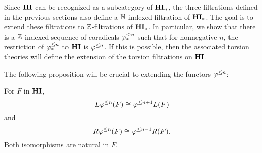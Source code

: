 Since $\mathbf{HI}$ can be recognized as a subcategory of $\mathbf{HI}_*$, the
three filtrations defined in the previous sections also define
a $\mathbb{N}$-indexed filtration of $\mathbf{HI}_*$. The goal is to extend these
filtrations to $\mathbb{Z}$-filtrations of $\mathbf{HI}_*$. In particular, we show
that there is a $\mathbb{Z}$-indexed sequence of coradicals $\varphi^{\leq n}_{*}$
such that for nonnegative $n$, the restriction of $\varphi^{\leq n}_{*}$ to
$\mathbf{HI}$ is $\varphi^{\leq n}$. If this is possible, then the associated
torsion theories will define the extension of the torsion 
filtrations on $\mathbf{HI}$.

The following proposition will be crucial to extending the 
functors $\varphi^{\leq n}$:

\begin{prop}\label{prop_tl_L_R}
For $F$ in $\mathbf{HI}$, 
\[
L \varphi^{\leq n}(F) \cong \varphi^{\leq n + 1} L(F)
\]
and
\[
R\varphi^{\leq n}(F) \cong \varphi^{\leq n - 1}R(F).
\] 
Both isomorphisms are natural in $F$.
\end{prop}
